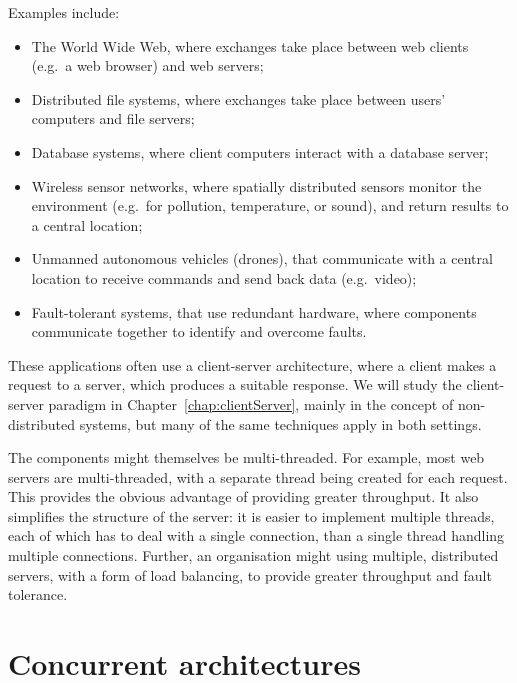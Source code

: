 Examples include:
\begin{itemize}
\item The World Wide Web, where exchanges take place between web
clients (e.g.~a web browser) and web servers; 

\item Distributed file systems, where exchanges take place between users'
  computers and file servers;

\item Database systems, where client computers interact with a database
  server;

\item Wireless sensor networks, where spatially distributed sensors monitor
  the environment (e.g.~for pollution, temperature, or sound), and return
  results to a central location;

\item Unmanned autonomous vehicles (drones), that communicate with a central
  location to receive commands and send back data (e.g.~video);

\item Fault-tolerant systems, that use redundant hardware, where components
  communicate together to identify and overcome faults. 
\end{itemize}

These applications often use a client-server architecture, where a client
makes a request to a server, which produces a suitable response.  We will
study the client-server paradigm in Chapter~\ref{chap:clientServer}, mainly in
the concept of non-distributed systems, but many of the same techniques apply
in both settings.

The components might themselves be multi-threaded.  For example, most web
servers are multi-threaded, with a separate thread being created for each
request.  This provides the obvious advantage of providing greater throughput.
It also simplifies the structure of the server: it is easier to implement
multiple threads, each of which has to deal with a single connection, than a
single thread handling multiple connections.  Further, an organisation might
using multiple, distributed servers, with a form of load balancing, to provide
greater throughput and fault tolerance.


\section{Concurrent architectures}

